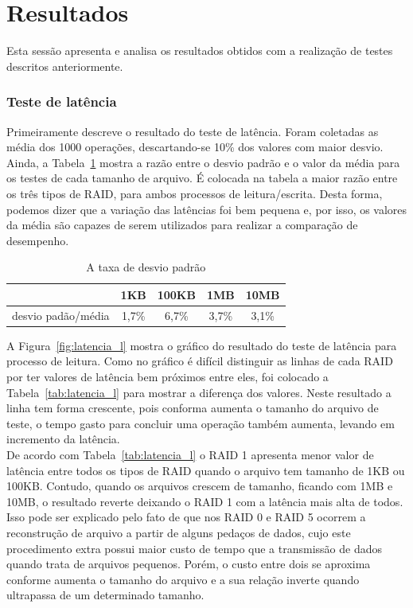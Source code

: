 
	\section{Resultados}
	Esta sessão apresenta e analisa os resultados obtidos com a realização de testes descritos anteriormente.
	\\
	
	\subsubsection{Teste de latência}
	Primeiramente descreve o resultado do teste de latência.
	Foram coletadas as média dos 1000 operações, descartando-se 10\% dos valores com maior desvio.
	Ainda, a Tabela~\ref{tab:desvio_padrao} mostra a razão entre o desvio padrão e o valor da média para os testes de cada tamanho de arquivo.
	É colocada na tabela a maior razão entre os três tipos de RAID, para ambos processos de leitura/escrita.
	Desta forma, podemos dizer que a variação das latências foi bem pequena e, por isso, os valores da média são capazes de serem utilizados para realizar a comparação de desempenho. 
	
	\capstartfalse
	\begin{table} [htb]
		\caption{A taxa de desvio padrão}
		\centering
		\begin{tabular}{|l|c|c|c|c|} \hline
						& 1KB	& 100KB		& 1MB		& 10MB  \\ \hline
			desvio padão/média	& 1,7\%	& 6,7\%		& 3,7\%		& 3,1\% \\ \hline
		\end{tabular}
		\label{tab:desvio_padrao}
	\end{table}
	\capstarttrue
	
	A Figura~\ref{fig:latencia_l} mostra o gráfico do resultado do teste de latência para processo de leitura.
	Como no gráfico é difícil distinguir as linhas de cada RAID por ter valores de latência bem próximos entre eles, foi colocado a Tabela~\ref{tab:latencia_l} para mostrar a diferença dos valores.
	Neste resultado a linha tem forma crescente, pois conforma aumenta o tamanho do arquivo de teste, o tempo gasto para concluir uma operação também aumenta, levando em incremento da latência.
	\\
	 
	De acordo com Tabela~\ref{tab:latencia_l} o RAID 1 apresenta menor valor de latência entre todos os tipos de RAID quando o arquivo tem tamanho de 1KB ou 100KB. Contudo, quando os arquivos crescem de tamanho, ficando com 1MB e 10MB, o resultado reverte deixando o RAID 1 com a latência mais alta de todos. 
	Isso pode ser explicado pelo fato de que nos RAID 0 e RAID 5 ocorrem a reconstrução de arquivo a partir de alguns pedaços de dados, cujo este procedimento extra possui maior custo de tempo que a transmissão de dados quando trata de arquivos pequenos. Porém, o custo entre dois se aproxima conforme aumenta o tamanho do arquivo e a sua relação inverte quando ultrapassa de um determinado tamanho.
	\\
	
